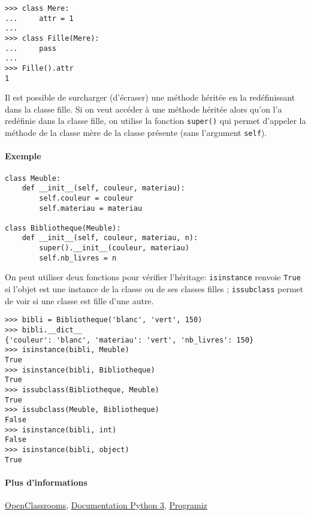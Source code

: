 \begin{verbatim}
>>> class Mere:
...     attr = 1
...
>>> class Fille(Mere):
...     pass
...
>>> Fille().attr
1
\end{verbatim}

Il est possible de surcharger (d'écraser) une méthode héritée en la redéfinissant dans la classe fille. Si on veut accéder à une méthode héritée alors qu'on l'a redéfinie dans la classe fille, on utilise la fonction \texttt{super()} qui permet d'appeler la méthode de la classe mère de la classe présente (sans l'argument \texttt{self}).

\paragraph{Exemple}
\begin{verbatim}
class Meuble:
    def __init__(self, couleur, materiau):
        self.couleur = couleur
        self.materiau = materiau

class Bibliotheque(Meuble):
    def __init__(self, couleur, materiau, n):
        super().__init__(couleur, materiau)
        self.nb_livres = n
\end{verbatim}
On peut utiliser deux fonctions pour vérifier l'héritage: \texttt{isinstance} renvoie \texttt{True} si l'objet est une instance de la classe ou de ses classes filles ; \texttt{issubclass} permet de voir si une classe est fille d'une autre.

\begin{verbatim}
>>> bibli = Bibliotheque('blanc', 'vert', 150)
>>> bibli.__dict__
{'couleur': 'blanc', 'materiau': 'vert', 'nb_livres': 150}
>>> isinstance(bibli, Meuble)
True
>>> isinstance(bibli, Bibliotheque)
True
>>> issubclass(Bibliotheque, Meuble)
True
>>> issubclass(Meuble, Bibliotheque)
False
>>> isinstance(bibli, int)
False
>>> isinstance(bibli, object)
True
\end{verbatim}

\paragraph{Plus d'informations} \href{https://openclassrooms.com/courses/apprenez-a-programmer-en-python/l-heritage-9}{OpenClassrooms}, \href{https://docs.python.org/fr/3/tutorial/classes.html?highlight=héritage#inheritance}{Documentation Python 3}, \href{https://www.programiz.com/python-programming/inheritance}{Programiz}



